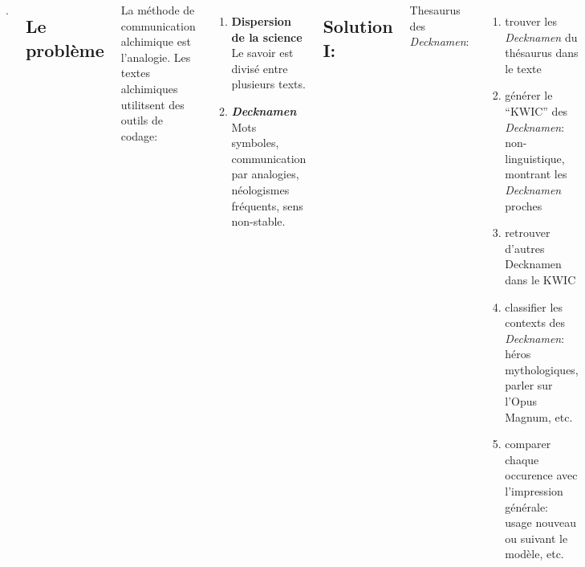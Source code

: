 \documentclass[25pt, a0paper, portrait,innermargin=35mm,
blockverticalspace=30mm, colspace=90mm, subcolspace=3mm]{tikzposter}
\begin{document}
\begin{columns}
\block{}
{
\vspace{-14cm}
\begin{minipage}{0.05\textwidth}
\color{white}.
\end{minipage}\hfill
\begin{minipage}{0.4\textwidth}
\subsection*{\Large Le problème}
La méthode de communication alchimique est l’analogie. 
Les textes alchimiques utilitsent des outils de codage:
\begin{enumerate}
    \item \textbf{Dispersion de la science} Le savoir est divisé entre plusieurs texts.
    \item \textbf{\emph{Decknamen}} Mots symboles, communication par analogies, néologismes fréquents, sens non-stable.
\end{enumerate}


\subsection*{\Large Solution I:}
Thesaurus des \emph{Decknamen}:
\begin{enumerate}
    \item trouver les \emph{Decknamen} du thésaurus dans le texte
    \item générer le ``KWIC'' des \emph{Decknamen}: non-linguistique, montrant les \emph{Decknamen} proches
    \item retrouver d'autres Decknamen dans le KWIC
    \item classifier les contexts des \emph{Decknamen}: héros mythologiques, parler sur l'Opus Magnum, etc.
    \item comparer chaque occurence avec l'impression générale: usage nouveau ou suivant le modèle, etc.

\end{enumerate}
\end{minipage}\hfill


}

\block{}
{
\vspace{-25cm}
\hspace{3cm}\includegraphics[width=0.2\textwidth]{steindweisen-bg.png}

}
\end{columns}
\end{document}
